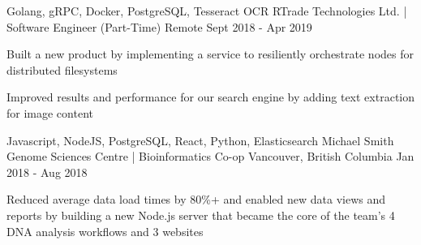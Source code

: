 \begin{cventries}
  \cventry
    {Golang, gRPC, Docker, PostgreSQL, Tesseract OCR} %
    {RTrade Technologies Ltd. | Software Engineer (Part-Time)} %
    {Remote} %
    {Sept 2018 - Apr 2019} %
    {
      \begin{cvitems} %
        \item {Built a new product by implementing a service to resiliently orchestrate nodes for distributed filesystems}
        \item {Improved results and performance for our search engine by adding text extraction for image content}
      \end{cvitems}
    }

  \cventry
    {Javascript, NodeJS, PostgreSQL, React, Python, Elasticsearch} %
    {Michael Smith Genome Sciences Centre | Bioinformatics Co-op} %
    {Vancouver, British Columbia} %
    {Jan 2018 - Aug 2018} %
    {
      \begin{cvitems} %
        \item {Reduced average data load times by 80\%+ and enabled new data views and reports by building a new Node.js server that became the core of the team’s 4 DNA analysis workflows and 3 websites}
      \end{cvitems}
    }

\end{cventries}
